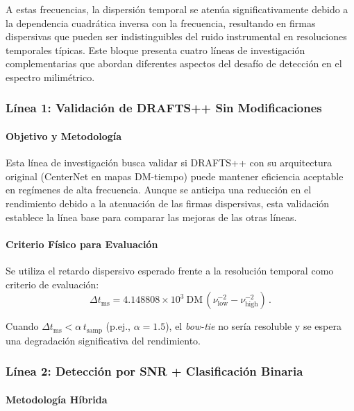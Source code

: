 A estas frecuencias, la dispersión temporal se atenúa significativamente debido a la dependencia cuadrática inversa con la frecuencia, resultando en firmas dispersivas que pueden ser indistinguibles del ruido instrumental en resoluciones temporales típicas. Este bloque presenta cuatro líneas de investigación complementarias que abordan diferentes aspectos del desafío de detección en el espectro milimétrico.

\subsubsection{Línea 1: Validación de DRAFTS++ Sin Modificaciones}

\paragraph{Objetivo y Metodología}

Esta línea de investigación busca validar si DRAFTS++ con su arquitectura original (CenterNet en mapas DM-tiempo) puede mantener eficiencia aceptable en regímenes de alta frecuencia. Aunque se anticipa una reducción en el rendimiento debido a la atenuación de las firmas dispersivas, esta validación establece la línea base para comparar las mejoras de las otras líneas.

\paragraph{Criterio Físico para Evaluación}

Se utiliza el retardo dispersivo esperado frente a la resolución temporal como criterio de evaluación:
\[
\Delta t_{\mathrm{ms}} = 4.148808 \times 10^{3}\ \mathrm{DM}\,(\nu_{\mathrm{low}}^{-2}-\nu_{\mathrm{high}}^{-2}) \, .
\]

Cuando $\Delta t_{\mathrm{ms}} < \alpha\, t_{\mathrm{samp}}$ (p.ej., $\alpha\!=\!1.5$), el \textit{bow-tie} no sería resoluble y se espera una degradación significativa del rendimiento.

\subsubsection{Línea 2: Detección por SNR + Clasificación Binaria}

\paragraph{Metodología Híbrida}

